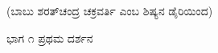 

\begin{center}
(ಬಾಬು ಶರತ್‌ಚಂದ್ರ ಚಕ್ರವರ್ತಿ ಎಂಬ ಶಿಷ್ಯನ ಡೈರಿಯಿಂದ)
\end{center}

\num{ಭಾಗ ೧} ಪ್ರಥಮ ದರ್ಶನ

